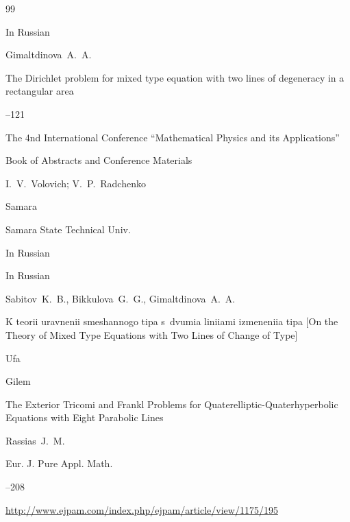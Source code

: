 \begin{thebibliography}{99}




\lang In Russian

\by Gimaltdinova~A.~A. 

\paper The Dirichlet problem for mixed type equation  with two lines  of degeneracy  in a rectangular area

--121

\inbook  The 4nd International Conference ``Mathematical Physics and its Applications''

\bookinfo Book of Abstracts and Conference Materials

\eds I.~V.~Volovich; V.~P.~Radchenko

\publaddr Samara

\publ Samara State Technical Univ.


\lang In Russian






\lang In Russian

\by Sabitov~K.~B., Bikkulova~G.~G., Gimaltdinova~A.~A.

\book K teorii uravnenii smeshannogo tipa s~dvumia liniiami izmeneniia tipa \rm [On the Theory of Mixed Type Equations with Two Lines of Change of Type]

\publaddr Ufa

\publ Gilem










\paper The Exterior Tricomi and Frankl Problems for Quaterelliptic-Quater\-hyper\-bolic Equations with Eight Parabolic Lines

\by Rassias~J.~M.

\jour Eur. J. Pure Appl. Math.




--208

\elink \url{http://www.ejpam.com/index.php/ejpam/article/view/1175/195}








\end{thebibliography}
